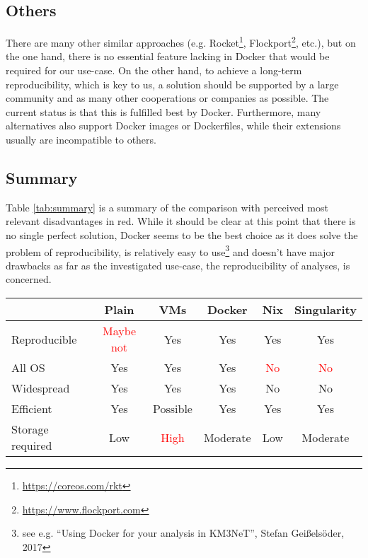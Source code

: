\documentclass[a4paper, twoside, 11pt]{article}
\begin{document}
\subsection{Others}

There are many other similar approaches 
(e.g. Rocket\footnote{\url{https://coreos.com/rkt}}, Flockport\footnote{\url{https://www.flockport.com}}, etc.), 
but on the one hand, there is no essential feature lacking in Docker that would be required 
for our use-case. 
On the other hand, to achieve a long-term reproducibility, which is key to us, 
a solution should be supported by a large community and as many other cooperations or companies as possible. 
The current status is that this is fulfilled best by Docker. 
Furthermore, many alternatives also support Docker images or Dockerfiles, while their extensions usually are incompatible to others. 

\subsection{Summary}

Table \ref{tab:summary} is a summary of the comparison with perceived most relevant disadvantages in red.  
While it should be clear at this point that there is no single perfect solution, 
Docker seems to be the best choice as it does solve the problem of reproducibility, 
is relatively easy to use\footnote{see e.g. ``Using Docker for your analysis in KM3NeT'', Stefan Geißelsöder, 2017}
and doesn't have major drawbacks as far as the investigated use-case, the reproducibility of analyses, is concerned. 


\begin{center}
\begin{tabular}{ l | c | c | c | c | c }
\label{tab:summary}
      & Plain 	& VMs 	& Docker 	& Nix 	& Singularity \\
  \hline
  Reproducible & \textcolor{red}{Maybe not} 	& Yes 	& Yes		& Yes	& Yes \\
  \hline
  All OS & Yes 	& Yes 	& Yes		& \textcolor{red}{No}	& \textcolor{red}{No} \\
  \hline
  Widespread & Yes & Yes & Yes & No & No \\
  \hline
  Efficient & Yes & Possible & Yes & Yes & Yes \\
  \hline
  Storage required & Low & \textcolor{red}{High} & Moderate & Low & Moderate \\
\end{tabular}
\end{center}
\end{document}
